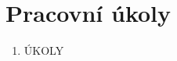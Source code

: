 \documentclass[a4paper]{article}
\author{Vladislav Wohlrath}
\begin{document}
%

\section*{Pracovní úkoly}
\begin{enumerate}
\item ÚKOLY \cite{englich} \cite{ZFP}
\end{enumerate}












\printbibliography[title={Seznam použité literatury}]
\end{document}
